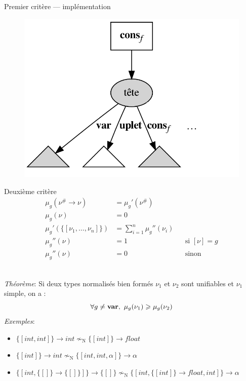 \documentclass[serif]{beamer}
\newcommand{\exemples}{\textit{Exemples}\xspace}
\newcommand{\theoreme}{\textit{Théorème}\xspace}
\newcommand{\interval}[2]{[\![#1\,;#2]\!]}
\newcommand{\mset}[1]{\{\![#1]\!\}}
\newcommand{\N}{\mathrm{N}}
\begin{document}
\begin{frame}{Premier critère — implémentation}
\begin{figure}[h]
  \includegraphics[scale=0.12]{graphs/crit1_3}
\end{figure}
\end{frame}


\begin{frame}{Deuxième critère}
\scriptsize
\begin{align*}
    \mu_g (\nu^\# \rightarrow \nu) &=
    \mu_g' (\nu^\#)
  \\
    \mu_g (\nu) &=
    0
  \\
    \mu_g' (\mset{\nu_1, \dots, \nu_n}) &=
    \sum_{i=1}^n \mu_g'' (\nu_i)
  \\
    \mu_g'' (\nu) &=
    1 &&
    \text{si } [\nu] = g
  \\
    \mu_g'' (\nu) &=
    0 &&
    \text{sinon}
\end{align*}
\medskip
{}
\\
\theoreme : Si deux types normalisés bien formés $\nu_1$ et $\nu_2$ sont unifiables et $\nu_1$ simple, on a :
\[ \forall g \neq \bold{var},\ \mu_g (\nu_1) \geqslant \mu_g (\nu_2) \]
\exemples :
\begin{itemize}
  \item $\mset{int, int} \rightarrow int \nsim_\N \mset{int} \rightarrow float$
  \item $\mset{int} \rightarrow int \nsim_\N \mset{int, int, \alpha} \rightarrow \alpha$
  \item $\mset{int, \mset{} \rightarrow \mset{}} \rightarrow \mset{} \nsim_\N \mset{int, \mset{int} \rightarrow float, int} \rightarrow \alpha$
\end{itemize}
\end{frame}
\end{document}
